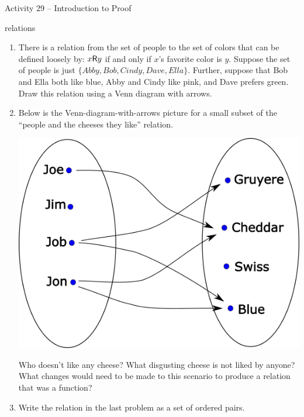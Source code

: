\documentclass{amsart}
\begin{document}
\thispagestyle{empty}

\centerline{\Large Activity 29 -- Introduction to Proof}
\centerline{\large relations}

\bigskip
\Large


\begin{enumerate}
\item There is a relation from the set of people to the set of colors that can be defined loosely by: $x\mbox{\textsf R} y$ if and only if $x$'s favorite color is $y$.  Suppose the set of people is just $\{ Abby, Bob, Cindy, Dave, Ella\} $.  Further, suppose that Bob and Ella both like blue, Abby and Cindy like pink, and Dave prefers green.
Draw this relation using a Venn diagram with arrows.

\vfill

\newpage

\item Below is the Venn-diagram-with-arrows picture for a small subset of the ``people and the cheeses they like'' relation.  
\bigskip

\centerline{\includegraphics[scale=.5]{relation_pic.png}}
\medskip

Who doesn't like any cheese?  What disgusting cheese is not liked by anyone? What changes would need to be made to this scenario to produce a relation that was a function?

\vfill

\item Write the relation in the last problem as a set of ordered pairs.

\vfill

\newpage


\end{enumerate}
\end{document}
